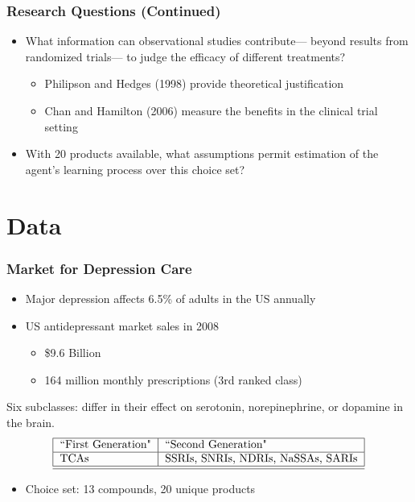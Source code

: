 \begin{frame}
\frametitle{Research Questions (Continued)}

\begin{itemize}
\item What information can observational studies contribute--- beyond
results from randomized trials--- to judge the efficacy of different
treatments?

\begin{itemize}
\item Philipson and Hedges (1998) provide theoretical justification

\item Chan and Hamilton (2006) measure the benefits in the clinical trial
setting
\end{itemize}

\item With 20 products available, what assumptions permit estimation of the
agent's learning process over this choice set?
\end{itemize}
\end{frame}


\section{Data}


\begin{frame}
\frametitle{Market for Depression Care}

\begin{itemize}
\item Major depression affects 6.5\% of adults in the US annually

\item US antidepressant market sales in 2008

\begin{itemize}
\item \$9.6 Billion

\item 164 million monthly prescriptions (3rd ranked class)
\end{itemize}
\end{itemize}

Six subclasses: differ in their effect on serotonin, norepinephrine, or
dopamine in the brain.%
\[
\begin{tabular}{|l|l|}
\hline
$\text{``First Generation"}$ & $\text{``Second Generation"}$ \\ \hline
$\text{TCAs}$ & $\text{SSRIs, SNRIs, NDRIs, NaSSAs, SARIs}$ \\ \hline\hline
\end{tabular}%
\]

\begin{itemize}
\item Choice set: 13 compounds, 20 unique products
\end{itemize}
\end{frame}

